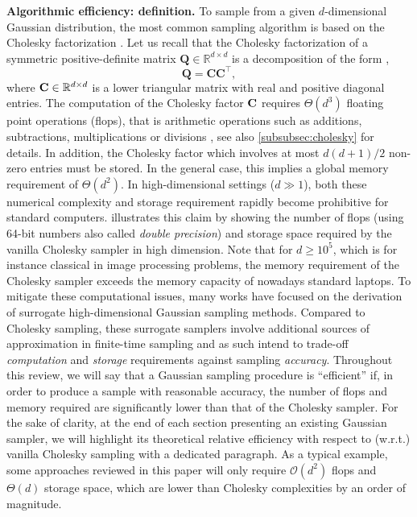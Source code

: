 \documentclass[nohypdvips,onefignum,onetabnum]{siamart171218}
\begin{document}
\noindent\textbf{Algorithmic efficiency: definition.}
To sample from a given $d$-dimensional Gaussian distribution, the most common sampling algorithm is based on the Cholesky factorization \cite{Rue2001}.
Let us recall that the Cholesky factorization of a symmetric positive-definite matrix $\mathbf{Q} \in \mathbb{R}^{d \times d}$ is a decomposition of the form \cite[Section 2.4]{Rue2005},
\begin{equation}
    \label{choleskyfact}
    \mathbf{Q} =\mathbf{CC}^{\top},
\end{equation}
where $\mathbf{C} \in \mathbb{R}^{d \times d}$ is a lower triangular matrix with real and positive diagonal entries.
The computation of the Cholesky factor $\mathbf{C}$ requires $\Theta(d^3)$ floating point operations (flops), that is arithmetic operations such as additions, subtractions, multiplications or divisions \cite{Golub1989}, see also \cref{subsubsec:cholesky} for details.
In addition, the Cholesky factor which involves at most $d(d+1)/2$ non-zero entries must be stored.
In the general case, this implies a global memory requirement of $\Theta(d^2)$.
In high-dimensional settings ($d \gg 1$), both these numerical complexity and storage requirement rapidly become prohibitive for standard computers.
 illustrates this claim by showing the number of flops (using 64-bit numbers also called \emph{double precision}) and storage space required by the vanilla Cholesky sampler in high dimension.
Note that for $d \ge 10^5$, which is for instance classical in image processing problems, the memory requirement of the Cholesky sampler exceeds the memory capacity of nowadays standard laptops.
To mitigate these computational issues, many works have focused on the derivation of surrogate high-dimensional Gaussian sampling methods.
Compared to Cholesky sampling, these surrogate samplers involve additional sources of approximation in finite-time sampling and as such intend to trade-off \emph{computation} and  \emph{storage} requirements against sampling \emph{accuracy}.
Throughout this review, we will say that a Gaussian sampling procedure is ``efficient'' if, in order to produce a sample with reasonable accuracy, the number of flops and memory required are significantly lower than that of the Cholesky sampler.
For the sake of clarity, at the end of each section presenting an existing Gaussian sampler, we will highlight its theoretical relative efficiency with respect to (w.r.t.) vanilla Cholesky sampling with a dedicated paragraph.
As a typical example, some approaches reviewed in this paper will only require $\mathcal{O}(d^2)$ flops and $\Theta(d)$ storage space, which are lower than Cholesky complexities by an order of magnitude.
\end{document}

